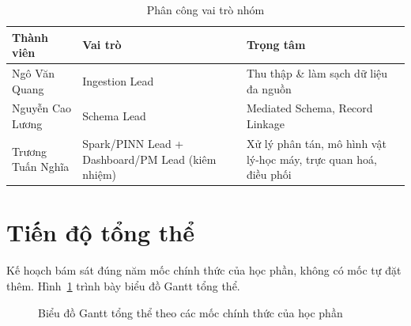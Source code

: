 \documentclass[12pt,a4paper]{report}
\begin{document}
\begin{table}[H]
\centering
\caption{Phân công vai trò nhóm}
\label{tab:team}
\begin{tabular}{@{}L{3.2cm}L{3.4cm}L{6cm}@{}}
\toprule
\textbf{Thành viên} & \textbf{Vai trò} & \textbf{Trọng tâm} \\
\midrule
Ngô Văn Quang & Ingestion Lead & Thu thập \& làm sạch dữ liệu đa nguồn \\
Nguyễn Cao Lương & Schema Lead & Mediated Schema, Record Linkage \\
Trương Tuấn Nghĩa & Spark/PINN Lead + Dashboard/PM Lead (kiêm nhiệm) & Xử lý phân tán, mô hình vật lý-học máy, trực quan hoá, điều phối \\
\bottomrule
\end{tabular}
\end{table}

\section{Tiến độ tổng thể}

Kế hoạch bám sát đúng năm mốc chính thức của học phần, không có mốc tự đặt thêm. Hình~\ref{fig:gantt} trình bày biểu đồ Gantt tổng thể.

\begin{figure}[H]
\centering
{}
\caption{Biểu đồ Gantt tổng thể theo các mốc chính thức của học phần}
\label{fig:gantt}
\end{figure}
\end{document}
